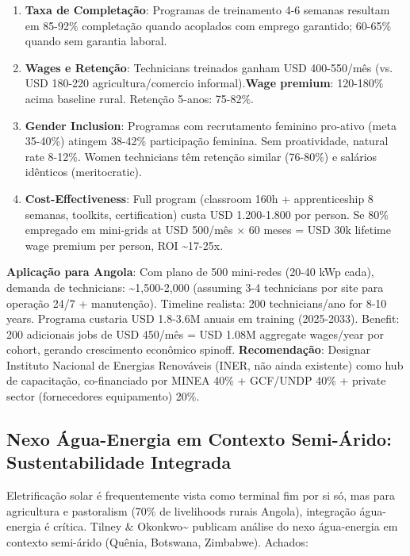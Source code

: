 \documentclass[12pt, a4paper]{article}
\begin{document}
\begin{enumerate}
\item\textbf{Taxa de Completação}: Programas de treinamento 4-6 semanas resultam em 85-92\% completação quando acoplados com emprego garantido; 60-65\% quando sem garantia laboral.
\item\textbf{Wages e Retenção}: Technicians treinados ganham USD 400-550/mês (vs. USD 180-220 agricultura/comercio informal).\textbf{Wage premium}: 120-180\% acima baseline rural. Retenção 5-anos: 75-82\%.
\item\textbf{Gender Inclusion}: Programas com recrutamento feminino pro-ativo (meta 35-40\%) atingem 38-42\% participação feminina. Sem proatividade, natural rate 8-12\%. Women technicians têm retenção similar (76-80\%) e salários idênticos (meritocratic).
\item\textbf{Cost-Effectiveness}: Full program (classroom 160h + apprenticeship 8 semanas, toolkits, certification) custa USD 1.200-1.800 por person. Se 80\% empregado em mini-grids at USD 500/mês × 60 meses = USD 30k lifetime wage premium per person, ROI \textasciitilde{}17-25x.
\end{enumerate}
\textbf{Aplicação para Angola}: Com plano de 500 mini-redes (20-40 kWp cada), demanda de technicians: \textasciitilde{}1,500-2,000 (assuming 3-4 technicians por site para operação 24/7 + manutenção). Timeline realista: 200 technicians/ano for 8-10 years. Programa custaria USD 1.8-3.6M anuais em training (2025-2033). Benefit: 200 adicionais jobs de USD 450/mês = USD 1.08M aggregate wages/year por cohort, gerando crescimento econômico spinoff.
\textbf{Recomendação}: Designar Instituto Nacional de Energias Renováveis (INER, não ainda existente) como hub de capacitação, co-financiado por MINEA 40\% + GCF/UNDP 40\% + private sector (fornecedores equipamento) 20\%.

\subsection{Nexo Água-Energia em Contexto Semi-Árido: Sustentabilidade Integrada}

Eletrificação solar é frequentemente vista como terminal fim por si só, mas para agricultura e pastoralism (70\% de livelihoods rurais Angola), integração água-energia é crítica. Tilney \& Okonkwo\textasciitilde{}\citep{Tilney2024} publicam análise do nexo água-energia em contexto semi-árido (Quênia, Botswana, Zimbabwe). Achados:
\end{document}
